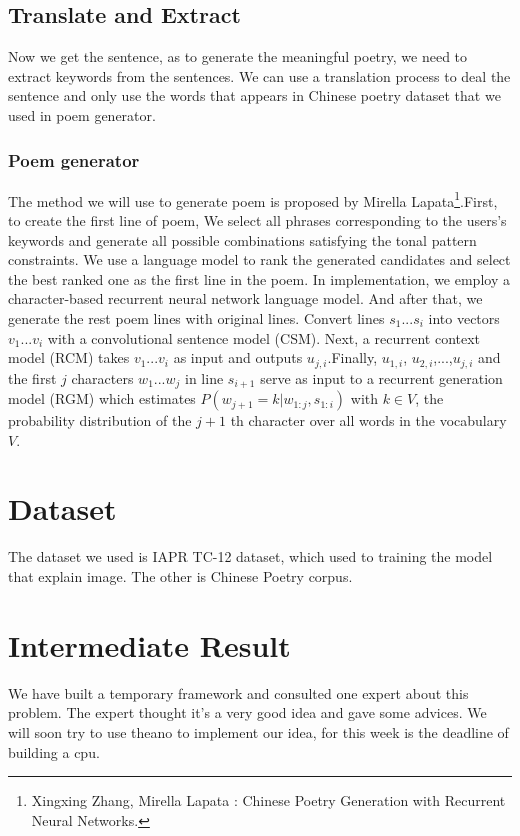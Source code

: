 \documentclass[10pt,twocolumn,letterpaper]{article}
\begin{document}
\subsection{Translate and Extract}
Now we get the sentence, as to generate the meaningful poetry, we need to extract keywords from the sentences. We can use a translation process to deal the sentence and only use the words that appears in Chinese poetry dataset that we used in poem generator.

\subsubsection{Poem generator}
	The method we will use to generate poem is proposed by Mirella Lapata\footnote{Xingxing Zhang, Mirella Lapata : Chinese Poetry Generation with Recurrent Neural Networks.}.First, to create the first line of poem, We select all phrases corresponding to the users’s keywords and generate all possible combinations satisfying the tonal pattern constraints. We use a language model to rank the generated candidates and select the best ranked one as the first line in the poem. In implementation, we employ a character-based recurrent neural network language model.
	And after that, we generate the rest poem lines with original lines. Convert lines $s_1$...$s_i$ into vectors $v_1$...$v_i$ with a convolutional sentence model (CSM). Next, a recurrent context model (RCM) takes $v_1$...$v_i$ as input and outputs $u_{j,i}$.Finally, $u_{1,i}$, $u_{2,i}$,...,$u_{j,i}$ and the first $j$ characters $w_1$...$w_j$ in line $s_{i+1}$ serve as input to a recurrent generation model (RGM) which estimates $P(w_{j+1} = k | w_{1:j} ,s_{1:i} )$ with $k\in V$, the probability distribution of the $j+1$ th character over all words in the vocabulary $V$.
\section{Dataset}
The dataset we used is IAPR TC-12 dataset, which used to training the model that explain image. The other is Chinese Poetry corpus.
\section{Intermediate Result}
We have built a temporary framework and consulted one expert about this problem. The expert thought it's a very good idea and gave some advices.
We will soon try to use theano to implement our idea, for this week is the deadline of building a cpu.
\end{document}
